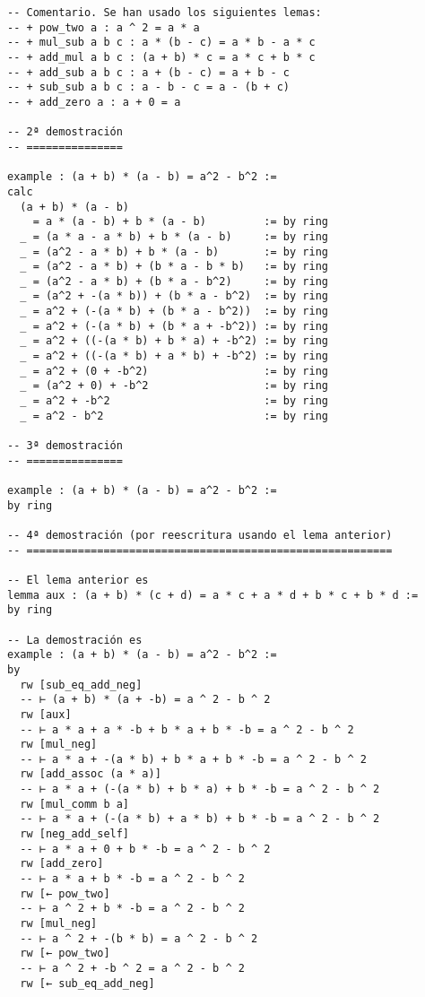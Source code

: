 \begin{verbatim}
-- Comentario. Se han usado los siguientes lemas:
-- + pow_two a : a ^ 2 = a * a
-- + mul_sub a b c : a * (b - c) = a * b - a * c
-- + add_mul a b c : (a + b) * c = a * c + b * c
-- + add_sub a b c : a + (b - c) = a + b - c
-- + sub_sub a b c : a - b - c = a - (b + c)
-- + add_zero a : a + 0 = a

-- 2ª demostración
-- ===============

example : (a + b) * (a - b) = a^2 - b^2 :=
calc
  (a + b) * (a - b)
    = a * (a - b) + b * (a - b)         := by ring
  _ = (a * a - a * b) + b * (a - b)     := by ring
  _ = (a^2 - a * b) + b * (a - b)       := by ring
  _ = (a^2 - a * b) + (b * a - b * b)   := by ring
  _ = (a^2 - a * b) + (b * a - b^2)     := by ring
  _ = (a^2 + -(a * b)) + (b * a - b^2)  := by ring
  _ = a^2 + (-(a * b) + (b * a - b^2))  := by ring
  _ = a^2 + (-(a * b) + (b * a + -b^2)) := by ring
  _ = a^2 + ((-(a * b) + b * a) + -b^2) := by ring
  _ = a^2 + ((-(a * b) + a * b) + -b^2) := by ring
  _ = a^2 + (0 + -b^2)                  := by ring
  _ = (a^2 + 0) + -b^2                  := by ring
  _ = a^2 + -b^2                        := by ring
  _ = a^2 - b^2                         := by ring

-- 3ª demostración
-- ===============

example : (a + b) * (a - b) = a^2 - b^2 :=
by ring

-- 4ª demostración (por reescritura usando el lema anterior)
-- =========================================================

-- El lema anterior es
lemma aux : (a + b) * (c + d) = a * c + a * d + b * c + b * d :=
by ring

-- La demostración es
example : (a + b) * (a - b) = a^2 - b^2 :=
by
  rw [sub_eq_add_neg]
  -- ⊢ (a + b) * (a + -b) = a ^ 2 - b ^ 2
  rw [aux]
  -- ⊢ a * a + a * -b + b * a + b * -b = a ^ 2 - b ^ 2
  rw [mul_neg]
  -- ⊢ a * a + -(a * b) + b * a + b * -b = a ^ 2 - b ^ 2
  rw [add_assoc (a * a)]
  -- ⊢ a * a + (-(a * b) + b * a) + b * -b = a ^ 2 - b ^ 2
  rw [mul_comm b a]
  -- ⊢ a * a + (-(a * b) + a * b) + b * -b = a ^ 2 - b ^ 2
  rw [neg_add_self]
  -- ⊢ a * a + 0 + b * -b = a ^ 2 - b ^ 2
  rw [add_zero]
  -- ⊢ a * a + b * -b = a ^ 2 - b ^ 2
  rw [← pow_two]
  -- ⊢ a ^ 2 + b * -b = a ^ 2 - b ^ 2
  rw [mul_neg]
  -- ⊢ a ^ 2 + -(b * b) = a ^ 2 - b ^ 2
  rw [← pow_two]
  -- ⊢ a ^ 2 + -b ^ 2 = a ^ 2 - b ^ 2
  rw [← sub_eq_add_neg]
\end{verbatim}

